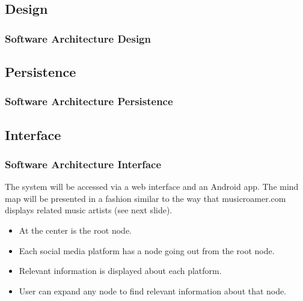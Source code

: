 \documentclass{beamer}
\begin{document}
	\subsection{Design}
		\begin{frame}
		\frametitle{Software Architecture Design}
		
		\end{frame}
		
	\subsection{Persistence}
		\begin{frame}
		\frametitle{Software Architecture Persistence}
		
		\end{frame}
		
	\subsection{Interface}
		\begin{frame}
		\frametitle{Software Architecture Interface}
			The system will be accessed via a web interface and an Android app. The mind map will be presented in a fashion similar to the way that musicroamer.com displays related music artists (see next slide).
			
			\begin{itemize}
				\item At the center is the root node.
				\item Each social media platform has a node going out from the root node.
				\item Relevant information is displayed about each platform.
				\item User can expand any node to find relevant information about that node.
			\end{itemize}
		\end{frame}
		
\end{document}
